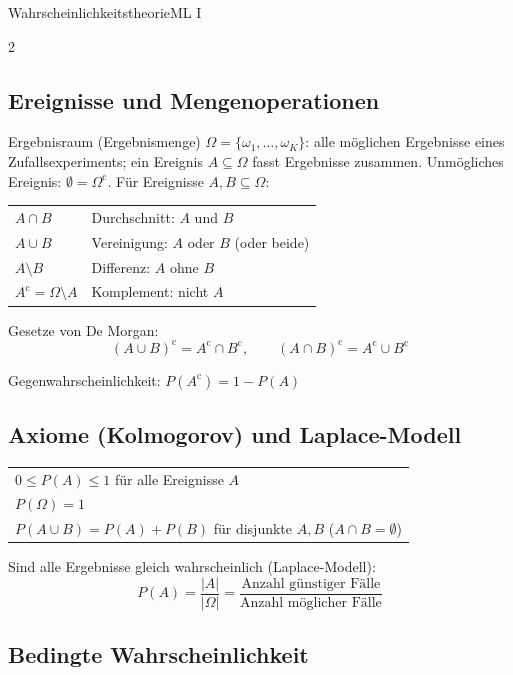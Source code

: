 \begin{formulaBox}{Wahrscheinlichkeitstheorie}{ML I}

\begin{multicols}{2}

\subsection*{Ereignisse und Mengenoperationen}

Ergebnisraum (Ergebnismenge) $\Omega = \{\omega_1, \dots, \omega_K\}$: alle möglichen Ergebnisse eines Zufallsexperiments; ein Ereignis $A \subseteq \Omega$ fasst Ergebnisse zusammen. Unmögliches Ereignis: $\emptyset = \Omega^{\mathrm{c}}$. Für Ereignisse $A, B \subseteq \Omega$:

\begin{tabular}{@{}ll@{}}
$A \cap B$ & Durchschnitt: $A$ und $B$ \\
$A \cup B$ & Vereinigung: $A$ oder $B$ (oder beide) \\
$A \setminus B$ & Differenz: $A$ ohne $B$ \\
$A^{\mathrm{c}} = \Omega \setminus A$ & Komplement: nicht $A$ \\
\end{tabular}

Gesetze von De Morgan:
\[
(A \cup B)^{\mathrm{c}} = A^{\mathrm{c}} \cap B^{\mathrm{c}}, \qquad
(A \cap B)^{\mathrm{c}} = A^{\mathrm{c}} \cup B^{\mathrm{c}}
\]

Gegenwahrscheinlichkeit: $P(A^{\mathrm{c}}) = 1 - P(A)$

\subsection*{Axiome (Kolmogorov) und Laplace-Modell}

\begin{tabular}{@{}l@{}}
$0 \le P(A) \le 1$ für alle Ereignisse $A$ \\
$P(\Omega) = 1$ \\
$P(A \cup B) = P(A) + P(B)$ für disjunkte $A, B$ ($A \cap B = \emptyset$) \\
\end{tabular}

Sind alle Ergebnisse gleich wahrscheinlich (Laplace-Modell):
\[
P(A) = \frac{|A|}{|\Omega|} = \frac{\text{Anzahl günstiger Fälle}}{\text{Anzahl möglicher Fälle}}
\]

\subsection*{Bedingte Wahrscheinlichkeit}


\end{multicols}
\end{formulaBox}

